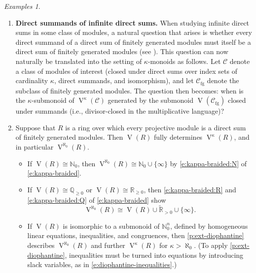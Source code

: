 \documentclass[a4paper,11pt,oneside]{amsart}
\theoremstyle{remark}
\newtheorem{examples}[teor]{Examples}
\newcommand{\bN}{\mathbb N}
\newcommand{\bQ}{\mathbb Q}
\newcommand{\bR}{\mathbb R}
\newcommand{\cC}{\mathcal C}
\DeclareMathOperator{\Vmon}{V}
\begin{document}
\begin{examples}
\begin{enumerate}
    Suppose that $R$ has finite KRSA for finitely generated projective modules.
    Then \cref{t:module-braiding} together with \cref{l:ext-basic} shows that direct-sum decompositions of projective modules into direct sums of \emph{finitely generated} indecomposable projective modules are unique.
    However, one must be careful in that direct sums of finitely-generated projective modules may in general also have direct summands that are \emph{not} direct sums of finitely generated modules, and \cref{t:module-braiding} does not imply anything about decompositions involving such modules.
    In terms of the $\kappa$-monoids, the $\kappa$-monoid $\langle \Vmon(R) \rangle_{\kappa}$ is braided over $\Vmon(R)$, but  $\big\langle\! \Vmon(R) \big\rangle_{\kappa}$ may not be closed under summands (in other words, divisor-closed) in $\Vmon^{\kappa}(R)$.
    
  \item \textbf{Direct summands of infinite direct sums.}
    When studying infinite direct sums in some class of modules, a natural question that arises is whether every direct summand of a direct sum of finitely generated modules must itself be a direct sum of finitely generated modules (see \cite[Question 1.1]{HerberaPrihodaWiegand23}).
    This question can now naturally be translated into the setting of $\kappa$-monoids as follows.
    Let $\cC$ denote a class of modules of interest (closed under direct sums over index sets of cardinality $\kappa$, direct summands, and isomorphism), and let $\cC_{\text{fg}}$ denote the subclass of finitely generated modules.
    The question then becomes: when is the $\kappa$-submonoid of $\Vmon^\kappa(\cC)$ generated by the submonoid $\Vmon(\cC_{\text{fg}})$ closed under summands (i.e., divisor-closed in the multiplicative language)?


  \item Suppose that $R$ is a ring over which every projective module is a direct sum of finitely generated modules.
    Then $\Vmon(R)$ fully determines $\Vmon^{\kappa}(R)$, and in particular $\Vmon^{\aleph_0}(R)$.

    \begin{itemize}
    \item If $\Vmon(R) \cong \bN_0$, then $\Vmon^{\aleph_0}(R) \cong \bN_0 \cup \{\infty\}$ by \ref{e:kappa-braided:N} of \cref{e:kappa-braided}.
    \item If $\Vmon(R)\cong\bQ_{\ge 0}$ or $\Vmon(R)\cong\bR_{\ge 0}$, then \ref{e:kappa-braided:R} and \ref{e:kappa-braided:Q} of \cref{e:kappa-braided} show
      \[
        \Vmon^{\aleph_0}(R) \cong \Vmon(R) \cup \widetilde{\bR}_{> 0} \cup \{\infty\}.
      \]
    \item If $\Vmon(R)$ is isomorphic to a submonoid of $\bN_0^n$, defined by homogeneous linear equations, inequalities, and congruences, then \cref{p:ext-diophantine} describes $\Vmon^{\aleph_0}(R)$ and further $\Vmon^{\kappa}(R)$ for $\kappa > \aleph_0$.
    (To apply \cref{p:ext-diophantine}, inequalities must be turned into equations by introducing slack variables, as in \cref{e:diophantine-inequalities}.)
    \end{itemize}


\end{enumerate}
\end{examples}
\end{document}
